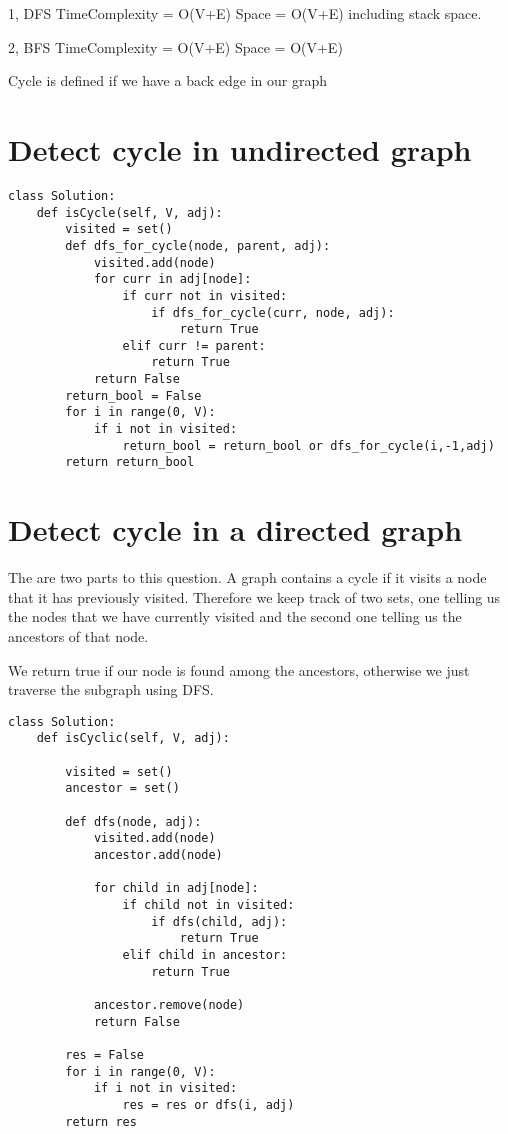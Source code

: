 \documentclass[24pt, a4]{article}
\begin{document}
1, DFS TimeComplexity = O(V+E) Space = O(V+E) including stack space.

2, BFS TimeComplexity = O(V+E) Space = O(V+E)

Cycle is defined if we have a back edge in our graph
\section{Detect cycle in undirected graph}
\begin{lstlisting}
class Solution:
	def isCycle(self, V, adj):
	    visited = set()
	    def dfs_for_cycle(node, parent, adj):
	        visited.add(node)
	        for curr in adj[node]:
	            if curr not in visited:
	                if dfs_for_cycle(curr, node, adj):
	                    return True
	            elif curr != parent:
	                return True
	        return False
	    return_bool = False
	    for i in range(0, V):
	        if i not in visited:
	            return_bool = return_bool or dfs_for_cycle(i,-1,adj)
	    return return_bool
\end{lstlisting}
\newpage
\section{Detect cycle in a directed graph}
The are two parts to this question. A graph contains a cycle if it visits a 
node that it has previously visited. Therefore we keep track of two sets, one
telling us the nodes that we have currently visited and the second one telling
us the ancestors of that node.

We return true if our node is found among the ancestors, otherwise we just
traverse the subgraph using DFS.
\begin{lstlisting}
class Solution:
    def isCyclic(self, V, adj):
        
        visited = set()
        ancestor = set()
        
        def dfs(node, adj):
            visited.add(node)
            ancestor.add(node)
            
            for child in adj[node]:
                if child not in visited:
                    if dfs(child, adj):
                        return True
                elif child in ancestor:
                    return True
            
            ancestor.remove(node)
            return False
        
        res = False
        for i in range(0, V):
            if i not in visited:
                res = res or dfs(i, adj)
        return res
\end{lstlisting}
\newpage
\end{document}

